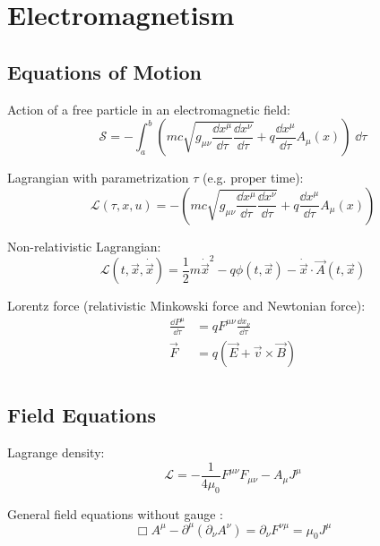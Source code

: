 \section{Electromagnetism}
	\subsection{Equations of Motion}
		\noindent
		Action of a free particle in an electromagnetic field:
		\begin{equation}
			\mathcal{S}=-\int_{a}^{b}\left(mc\sqrt{g_{\mu\nu}\frac{\dd x^\mu}{\dd \tau}\frac{\dd x^\nu}{\dd \tau}}
	+ q\frac{\dd x^\mu}{\dd \tau}A_\mu(x)\right)\;\dd\tau
		\end{equation}

		\noindent
		Lagrangian with parametrization $\tau$ (e.g. proper time):
		\begin{equation}
			\mathcal{L} (\tau,x,u) =-\left(mc\sqrt{g_{\mu\nu}\frac{\dd x^\mu}{\dd \tau}\frac{\dd x^\nu}{\dd \tau}}
			+ q\frac{\dd x^\mu}{\dd \tau}A_\mu(x)\right)
		\end{equation}

		\noindent
		Non-relativistic Lagrangian:
		\begin{equation}
			\mathcal{L}(t,\vec{x},\dot{\vec{x}}) = \frac{1}{2}m\dot{\vec{x}}^2 - q\phi(t,\vec{x}) - \dot{\vec{x}}\cdot\vec{A}(t,\vec{x})
		\end{equation}

		\noindent
		Lorentz force (relativistic Minkowski force and Newtonian force):
		\begin{equation}
			\begin{aligned}
				\frac{\dd P^\mu}{\dd \tau} &= q F^{\mu\nu}\frac{\dd x_\nu}{\dd \tau} \\
				\vec{F} &= q\left(\vec{E}+\vec{v}\times\vec{B}\right) \\
			\end{aligned}
		\end{equation}

	\subsection{Field Equations}
		\noindent
		Lagrange density:
		\begin{equation}
			\mathcal{L} = -\frac{1}{4\mu_0}F^{\mu\nu} F_{\mu\nu} - A_\mu J^\mu
		\end{equation}

		\noindent
		General field equations without gauge :
		\begin{equation}
			\Box A^\mu-\partial^\mu\left(\partial_\nu A^\nu\right) = \partial_\nu F^{\nu\mu} =  \mu_0 J^\mu
		\end{equation}

